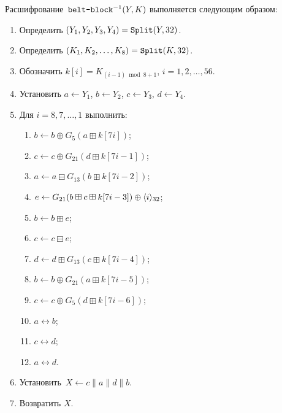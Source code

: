 Расшифрование~$\texttt{belt-block}^{-1}(Y,K)$ выполняется
следующим образом: 
\begin{enumerate}
\item
Определить $(Y_1,Y_2,Y_3,Y_4)=\mathop{\texttt{Split}}\nolimits(Y,32)$.
\item
Определить $(K_1,K_2,\ldots,K_8)=\mathop{\texttt{Split}}\nolimits(K,32)$.
\item
Обозначить $k[i]=K_{(i-1)\bmod 8 + 1}$, $i=1,2,\ldots,56$.
\item
Установить $a\leftarrow Y_1$, $b\leftarrow Y_2$, 
$c\leftarrow Y_3$, $d\leftarrow Y_4$.
\item
Для $i=8,7,\ldots,1$ выполнить:
\begin{enumerate}
\item
$b\leftarrow b\oplus G_{5}(a\boxplus k[7i])$;
\item
$c\leftarrow c\oplus G_{21}(d\boxplus k[7i-1])$;
\item
$a\leftarrow a\boxminus G_{13}(b\boxplus k[7i-2])$;
\item
$e\leftarrow G_{21}(b\boxplus c\boxplus k[7i-3])\oplus \langle i\rangle_{32}$;
\item
$b\leftarrow b\boxplus e$;
\item
$c\leftarrow c\boxminus e$;
\item
$d\leftarrow d\boxplus G_{13}(c\boxplus k[7i-4])$;
\item
$b\leftarrow b\oplus G_{21}(a\boxplus k[7i-5])$;
\item
$c\leftarrow c\oplus G_{5}(d\boxplus k[7i-6])$;
\item
$a\leftrightarrow b$;
\item
$c\leftrightarrow d$;
\item
$a\leftrightarrow d$.
\end{enumerate}
\item
Установить~$X\leftarrow c\parallel a\parallel d\parallel b$.
\item
Возвратить $X$.
\end{enumerate}
